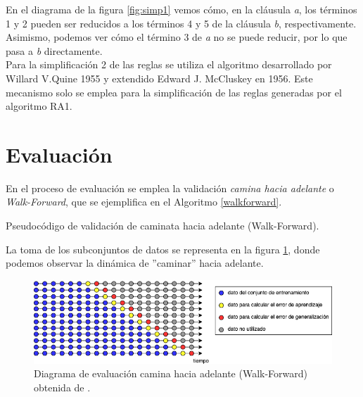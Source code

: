 En el diagrama de la figura \ref{fig:simp1} vemos cómo, en la cláusula \emph{a}, los términos 1 y 2 pueden ser reducidos a los términos 4 y 5 de la cláusula \emph{b}, respectivamente. Asimismo, podemos ver cómo el término 3 de \emph{a} no se puede reducir, por lo que pasa a \emph{b} directamente.
\\

Para la simplificación 2 de las reglas se utiliza el algoritmo desarrollado por Willard V.Quine 1955 y extendido Edward J. McCluskey en 1956. Este mecanismo solo se emplea para la simplificación de las reglas generadas por el algoritmo RA1.

\section{Evaluación}

En el proceso de evaluación se emplea la validación \emph{camina hacia adelante} o \emph{Walk-Forward}, que se ejemplifica en el Algoritmo \ref{walkforward}.

\begin{algorithm}[H] 
	\SetAlgoLined
	\caption{Pseudocódigo de validación de caminata hacia adelante (Walk-Forward). } \label{walkforward}
\end{algorithm}

\vspace{0.5cm}
La toma de los subconjuntos de datos se representa en la figura \ref{fig:walkforward}, donde podemos observar la dinámica de ''caminar'' hacia adelante.

\begin{figure}[H]
	\centering
	\includegraphics[width=\linewidth]{fig/walkforward}
	\caption{Diagrama de evaluación camina hacia adelante (Walk-Forward) obtenida de \cite{hyndman2018forecasting}.}
	\label{fig:walkforward}
\end{figure}

